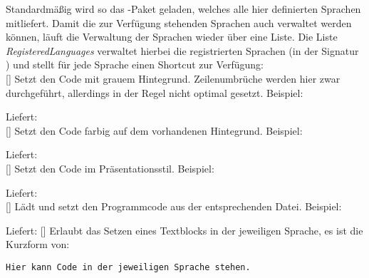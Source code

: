 Standardmäßig wird so das -Paket geladen, welches alle hier definierten Sprachen mitliefert. Damit die zur Verfügung stehenden Sprachen auch verwaltet werden können, läuft die Verwaltung der Sprachen wieder über eine Liste. Die Liste \emph{RegisteredLanguages} verwaltet hierbei die registrierten Sprachen (in der Signatur ) und stellt für jede Sprache einen Shortcut zur Verfügung:\\
%
%
%
[]
Setzt den Code mit grauem Hintegrund. Zeilenumbrüche werden hier zwar durchgeführt, allerdings in der Regel nicht optimal gesetzt. Beispiel: \begin{latex*}
\end{latex*}
Liefert: \\
%
%
%
[]
Setzt den Code farbig auf dem vorhandenen Hintegrund. Beispiel: \begin{latex*}
\end{latex*}
Liefert: \\
%
%
%
[]
Setzt den Code im Präsentationsstil. Beispiel: \begin{latex*}
\end{latex*}
Liefert: \\
%
%
%
[]
Lädt und setzt den Programmcode aus der entsprechenden Datei. Beispiel: \begin{latex*}
\end{latex*}
Liefert: 
%
%
%
[]
Erlaubt das Setzen eines Textblocks in der jeweiligen Sprache, es ist die Kurzform von:
\begin{latex}
\begin{lstlisting}[style=\pgfkeysvalueof{/lillyxLISTINGS/globals/listing style},language=<Sprache>]
    Hier kann Code in der jeweiligen Sprache stehen.
\end{lstlisting}
\end{latex}

